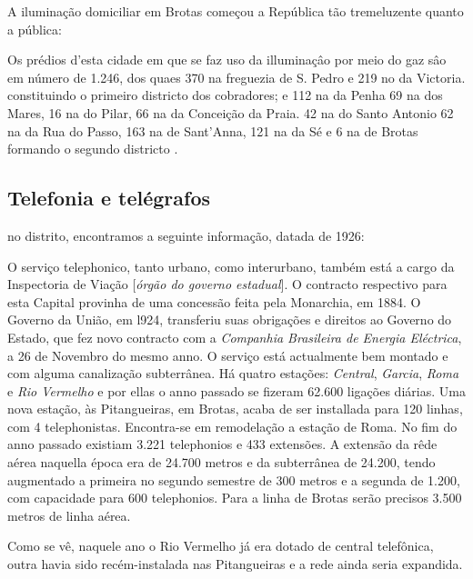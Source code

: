 A iluminação domiciliar em Brotas começou a República tão tremeluzente quanto a pública:

\begin{citacao}
Os prédios d'esta cidade em que se faz uso da illuminaçâo por meio do gaz sâo em número de 1.246, dos quaes 370 na freguezia de S. Pedro e 219 no da Victoria. constituindo o primeiro districto dos cobradores; e 112 na da Penha 69 na dos Mares, 16 na do Pilar, 66 na da Conceição da Praia. 42 na do Santo Antonio 62 na da Rua do Passo, 163 na de Sant'Anna, 121 na da Sé e 6 na de Brotas formando o segundo districto \cite[p.~151]{salvador_relatorio_1896}. 
\end{citacao}

\subsection{Telefonia e telégrafos} 

no distrito, encontramos a seguinte informação, datada de 1926:

\begin{citacao}
O serviço telephonico, tanto urbano, como interurbano, também está a cargo da Inspectoria de Viação [\textit{órgão do governo estadual}].
O contracto respectivo para esta Capital provinha de uma concessão feita pela Monarchia, em 1884.
O Governo da União, em l924, transferiu suas obrigações e direitos ao Governo do Estado, que fez novo contracto com a \textit{Companhia Brasileira de Energia Eléctrica}, a 26 de Novembro do mesmo anno.
O serviço está actualmente bem montado e com alguma canalização subterrânea.
Há quatro estações: \textit{Central}, \textit{Garcia}, \textit{Roma} e \textit{Rio Vermelho} e por ellas o anno passado se fizeram 62.600 ligações diárias.
Uma nova estação, às Pitangueiras, em Brotas, acaba de ser installada para 120 linhas, com 4 telephonistas.
Encontra-se em remodelação a estação de Roma.
No fim do anno passado existiam 3.221 telephonios e 433 extensões.
A extensão da rêde aérea naquella época era de 24.700 metros e da subterrânea de 24.200, tendo augmentado a primeira no segundo semestre de 300 metros e a segunda
de 1.200, com capacidade para 600 telephonios.
Para a linha de Brotas serão precisos 3.500 metros de linha aérea. \cite[pp.~266-267]{bahia_rpe_1926}
\end{citacao}

Como se vê, naquele ano o Rio Vermelho já era dotado de central telefônica, outra havia sido recém-instalada nas Pitangueiras e a rede ainda seria expandida.

